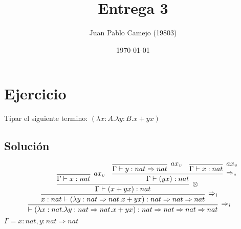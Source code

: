 \documentclass[a4paper,10pt]{article} %
\title{Entrega 3}
\author{Juan Pablo Camejo (19803)}
\date{\today}  %
\begin{document}
\maketitle   %

\section*{Ejercicio}
Tipar el siguiente termino: $(\lambda x:A.\lambda y:B .x+yx)$\\


\subsection*{Solución}
$$
\infer[\Rightarrow_i]{\vdash (\lambda x:nat .\lambda y:nat\Rightarrow nat .x+yx) :nat \Rightarrow nat \Rightarrow nat\Rightarrow nat}{
\infer[\Rightarrow_i]{  x:nat \vdash (\lambda y:nat\Rightarrow nat.x + y x) : nat \Rightarrow nat \Rightarrow nat }{
\infer[\otimes]{\Gamma \vdash  (x + y x) : nat}{
    \infer[ax_v]{\Gamma\vdash x:nat}{} & \infer[\Rightarrow_e]{\Gamma \vdash (yx):nat}{ 
        \infer[ax_v]{\Gamma \vdash y :nat \Rightarrow nat}{} &  \infer[ax_v]{\Gamma \vdash x:nat}{} }
                     }
                      }}
$$
$\Gamma = x:nat,y:nat\Rightarrow nat$
\end{document}
